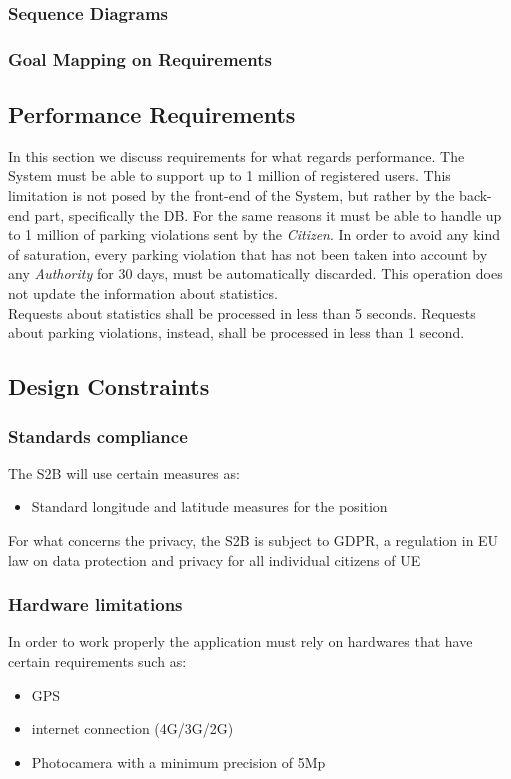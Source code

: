 \documentclass{article}
\begin{document}
\subsubsection{Sequence Diagrams}
\subsubsection{Goal Mapping on Requirements}

\subsection{Performance Requirements}
In this section we discuss requirements for what regards performance. The System must be able to support up to
1 million of registered users. This limitation is not posed by the front-end of the System, but rather by the 
back-end part, specifically the DB. For the same reasons it must be able to handle up to 1 million of parking violations 
sent by the \textit{Citizen}. In order to avoid any kind of saturation, every parking violation that has not been taken into account
 by any \textit{Authority} for 30 days, must be automatically discarded. This operation does not update the information about
 statistics.
 \\Requests about statistics shall be processed in less than 5 seconds. Requests about parking violations, instead, shall be processed 
 in less than 1 second.     

\subsection{Design Constraints}
\subsubsection{Standards compliance}
The S2B  will use certain measures as:
\begin{itemize}
    \item Standard longitude and latitude measures for the position
\end{itemize}
For what concerns the privacy, the S2B is subject to GDPR, a regulation in EU law on data protection 
and privacy for all individual citizens of UE  

\subsubsection{Hardware limitations}
In order to work properly the application must rely on hardwares that have certain requirements 
such as:
\begin{itemize}
    \item GPS
    \item internet connection (4G/3G/2G)
    \item Photocamera with a minimum precision of 5Mp 
\end{itemize}   
\end{document}
